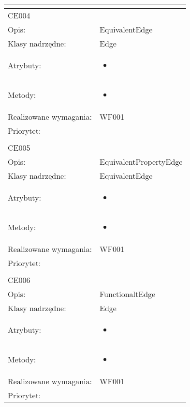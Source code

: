 \documentclass[a4paper,10pt]{article}
\begin{document}
\begin{center}
\begin{tabular}{|m{3cm}|m{9cm}|}
\multicolumn{2}{c}{} \\
 \hline

CE004 &  \\ \hline
Opis: & EquivalentEdge    \\ \hline
Klasy nadrzędne: & Edge    \\ \hline
Atrybuty: & \begin{itemize}
 \item 
\end{itemize}
 \\ \hline
Metody: & \begin{itemize}
 \item 
\end{itemize}
  \\ \hline
Realizowane wymagania: & WF001 \\ \hline
Priorytet: &  \\ \hline

\multicolumn{2}{c}{} \\
 \hline

CE005 &  \\ \hline
Opis: & EquivalentPropertyEdge    \\ \hline
Klasy nadrzędne: & EquivalentEdge    \\ \hline
Atrybuty: & \begin{itemize}
 \item 
\end{itemize}
 \\ \hline
Metody: & \begin{itemize}
 \item 
\end{itemize}
  \\ \hline
Realizowane wymagania: & WF001 \\ \hline
Priorytet: &  \\ \hline

\multicolumn{2}{c}{} \\
 \hline

CE006 &  \\ \hline
Opis: & FunctionaltEdge    \\ \hline
Klasy nadrzędne: & Edge    \\ \hline
Atrybuty: & \begin{itemize}
 \item 
\end{itemize}
 \\ \hline
Metody: & \begin{itemize}
 \item 
\end{itemize}
  \\ \hline
Realizowane wymagania: & WF001 \\ \hline
Priorytet: &  \\ \hline


\end{tabular}
\end{center}
\end{document}
